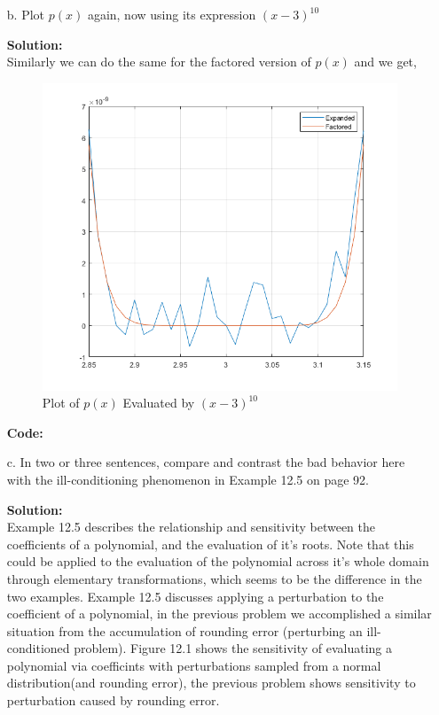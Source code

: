 \documentclass[12pt]{article}
\makeatletter
\theoremstyle{homework}
\newenvironment{exercise}[1]
{\def\@currentlabel{#1}\exercisecore}
{\endexercisecore}
\newcommand{\localhead}[1]{\par\smallskip\noindent\textbf{#1}\nobreak\\}%
\newcommand\solution{\localhead{Solution:}}
\makeatother
\begin{document}
\begin{exercise}{P19}
\begin{enumerate}
    \item[b.] Plot $p(x)$ again, now using its expression $(x - 3)^{10}$\\
    \solution Similarly we can do the same for the factored version of $p(x)$ and we get, 
    \begin{figure}[H]
      \begin{center}
        \caption{Plot of $p(x)$ Evaluated by $(x - 3)^{10}$}
         \includegraphics[width=.90\textwidth]{Fig1.png}
      \end{center}
    \end{figure}
    \textbf{Code:}
    \begin{center}
      
    \end{center}

    











    \item[c.] In two or three sentences, compare and contrast the bad behavior here with the ill-conditioning phenomenon in 
    Example 12.5 on page 92. \\   
    \solution Example 12.5 describes the relationship and sensitivity between the coefficients of a polynomial, and the evaluation of it's roots. Note 
    that this could be applied to the evaluation of the polynomial across it's whole domain through elementary transformations, which seems to be the difference 
    in the two examples. Example 12.5 discusses applying a perturbation to the coefficient of a polynomial, in the previous problem we accomplished a similar situation 
    from the accumulation of rounding error (perturbing an ill-conditioned problem). Figure 12.1 shows the sensitivity of evaluating a polynomial via coefficints with 
    perturbations sampled from a normal distribution(and rounding error), the previous problem shows sensitivity to perturbation caused by rounding error. 
  \end{enumerate}
\end{exercise}
\end{document}

